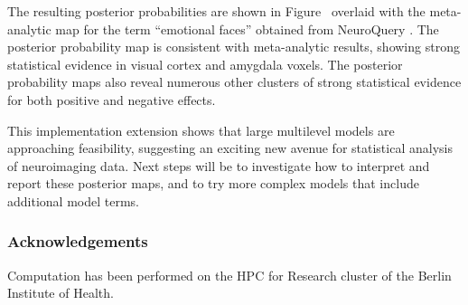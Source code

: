 \documentclass[../main.tex]{subfiles}
\begin{document}
The resulting posterior probabilities are shown in Figure~ overlaid with the meta-analytic map for the term ``emotional faces'' obtained from NeuroQuery \parencite{dockes_neuroquery_2020}. The posterior probability map is consistent with meta-analytic results, showing strong statistical evidence in visual cortex and amygdala voxels. The posterior probability maps also reveal numerous other clusters of strong statistical evidence for both positive and negative effects. 

This implementation extension shows that large multilevel models are approaching feasibility, suggesting an exciting new avenue for statistical analysis of neuroimaging data. Next steps will be to investigate how to interpret and report these posterior maps, and to try more complex models that include additional model terms.

\subsubsection*{Acknowledgements}

Computation has been performed on the HPC for Research cluster of the Berlin Institute of Health.
\end{document}

